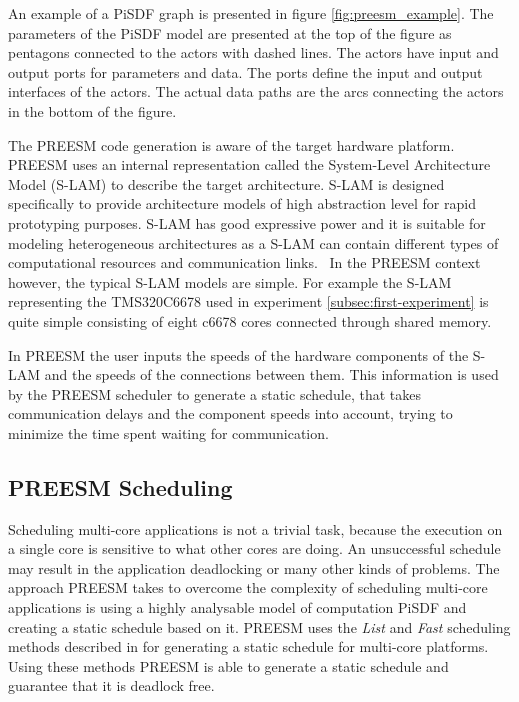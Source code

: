 An example of a PiSDF graph is presented in figure \ref{fig:preesm_example}. The parameters of the PiSDF model are presented at the top of the figure as pentagons connected to the actors with dashed lines. The actors have input and output ports for parameters and data. The ports define the input and output interfaces of the actors. The actual data paths are the arcs connecting the actors in the bottom of the figure.

The PREESM code generation is aware of the target hardware platform. PREESM uses an internal representation called the System-Level Architecture Model (S-LAM) \cite{pelcat2009system} to describe the target architecture. S-LAM is designed specifically to provide architecture models of high abstraction level for rapid prototyping purposes. S-LAM has good expressive power and it is suitable for modeling heterogeneous architectures as a S-LAM can contain different types of computational resources and communication links.~\cite{pelcat2009system} In the PREESM context however, the typical S-LAM models are simple. For example the S-LAM representing the TMS320C6678 used in experiment \ref{subsec:first-experiment} is quite simple consisting of eight c6678 cores connected through shared memory.

In PREESM the user inputs the speeds of the hardware components of the S-LAM and the speeds of the connections between them. This information is used by the PREESM scheduler to generate a static schedule, that takes communication delays and the component speeds into account, trying to minimize the time spent waiting for communication.~\cite{pelcat2009system}

\subsection{PREESM Scheduling}
\label{sec:preesm-scheduling}
Scheduling multi-core applications is not a trivial task, because the execution on a single core is sensitive to what other cores are doing. An unsuccessful schedule may result in the application deadlocking or many other kinds of problems. The approach PREESM takes to overcome the complexity of scheduling multi-core applications is using a highly analysable model of computation PiSDF and creating a static schedule based on it. PREESM uses the \textit{List} and \textit{Fast} scheduling methods described in \cite{kwok1997high} for generating a static schedule for multi-core platforms. Using these methods PREESM is able to generate a static schedule and guarantee that it is deadlock free.

